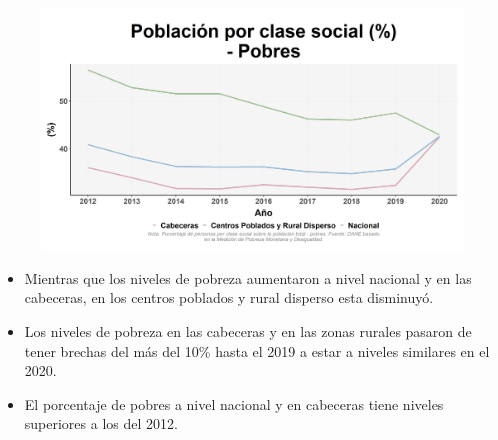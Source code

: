     \begin{figure}[H]
        \caption[Población por clase social - Pobres por zonas ]{\label{pobres_zonas} }
        \begin{center}
        \includegraphics[width=\textwidth,keepaspectratio]{img/var_243_trend.png}
        \end{center}
    \end{figure}
            \begin{itemize}
                    \item Mientras que los niveles de pobreza aumentaron a nivel nacional y en las cabeceras, en los centros poblados y rural disperso esta disminuyó.
                    \item Los niveles de pobreza en las cabeceras y en las zonas rurales pasaron de tener brechas del más del 10\% hasta el 2019 a estar a niveles similares en el 2020.
                    \item El porcentaje de pobres a nivel nacional y en cabeceras tiene niveles superiores a los del 2012.
                    \end{itemize}

